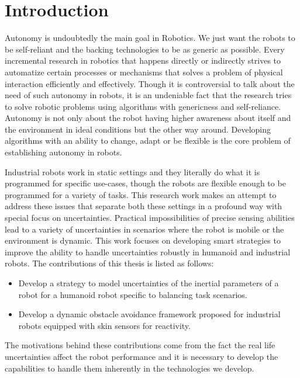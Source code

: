 \documentclass[a4paper,11pt,twoside]{StyleThese}
\begin{document}
\fi


\chapter*{Introduction}
Autonomy is undoubtedly the main goal in Robotics. We just want the robots to be self-reliant and the backing technologies to be as generic as possible. Every incremental research in robotics that happens directly or indirectly strives to automatize certain processes or mechanisms that solves a problem of physical interaction efficiently and effectively. Though it is controversial to talk about the need of such autonomy in robots, it is an undeniable fact that the research tries to solve robotic problems using algorithms with genericness and self-reliance. Autonomy is not only about the robot having higher awareness about itself and the environment in ideal conditions but the other way around. Developing algorithms with an ability to change, adapt or be flexible is the core problem of establishing autonomy in robots. 

Industrial robots work in static settings and they literally do what it is programmed for specific use-cases, though the robots are flexible enough to be programmed for a variety of tasks. This research work makes an attempt to address these issues that separate both these settings in a profound way with special focus on uncertainties. Practical impossibilities of precise sensing abilities lead to a variety of uncertainties in scenarios where the robot is mobile or the environment is dynamic. This work focuses on developing smart strategies to improve the ability to handle uncertainties robustly in humanoid and industrial robots. The contributions of this thesis is listed as follows:
\begin{itemize}
    \item Develop a strategy to model uncertainties of the inertial parameters of a robot for a humanoid robot specific to balancing task scenarios.
    \item Develop a dynamic obstacle avoidance framework proposed for industrial robots equipped with skin sensors for reactivity. 
\end{itemize}
The motivations behind these contributions come from the fact the real life uncertainties affect the robot performance and it is necessary to develop the capabilities to handle them inherently in the technologies we develop.
\end{document}
